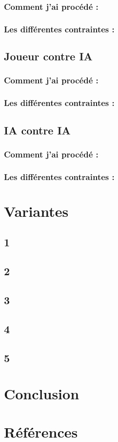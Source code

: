 \documentclass[12pt,a4paper]{memoir} %
\begin{document}
\subsection{Comment j'ai procédé :}

\subsection{Les différentes contraintes :}

\section{Joueur contre IA}

\subsection{Comment j'ai procédé :}

\subsection{Les différentes contraintes :}

\section{IA contre IA}

\subsection{Comment j'ai procédé :}

\subsection{Les différentes contraintes :}


\chapter{Variantes}


\section{1}
\section{2}
\section{3}
\section{4}
\section{5}


\chapter{Conclusion}


\chapter{Références}

\end{document}
